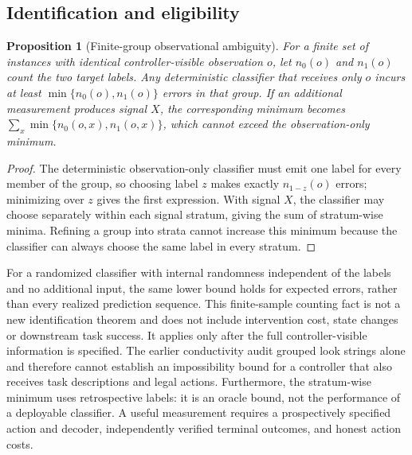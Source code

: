 \documentclass[11pt]{article}
\newtheorem{proposition}{Proposition}
\begin{document}
\subsection{Identification and eligibility}
\begin{proposition}[Finite-group observational ambiguity]
For a finite set of instances with identical controller-visible observation $o$, let $n_0(o)$ and $n_1(o)$ count the two target labels. Any deterministic classifier that receives only $o$ incurs at least $\min\{n_0(o),n_1(o)\}$ errors in that group. If an additional measurement produces signal $X$, the corresponding minimum becomes $\sum_x\min\{n_0(o,x),n_1(o,x)\}$, which cannot exceed the observation-only minimum.
\end{proposition}
\begin{proof}
The deterministic observation-only classifier must emit one label for every member of the group, so choosing label $z$ makes exactly $n_{1-z}(o)$ errors; minimizing over $z$ gives the first expression. With signal $X$, the classifier may choose separately within each signal stratum, giving the sum of stratum-wise minima. Refining a group into strata cannot increase this minimum because the classifier can always choose the same label in every stratum.
\end{proof}
For a randomized classifier with internal randomness independent of the labels and no additional input, the same lower bound holds for expected errors, rather than every realized prediction sequence. This finite-sample counting fact is not a new identification theorem and does not include intervention cost, state changes or downstream task success. It applies only after the full controller-visible information is specified. The earlier conductivity audit grouped look strings alone and therefore cannot establish an impossibility bound for a controller that also receives task descriptions and legal actions. Furthermore, the stratum-wise minimum uses retrospective labels: it is an oracle bound, not the performance of a deployable classifier. A useful measurement requires a prospectively specified action and decoder, independently verified terminal outcomes, and honest action costs.
\end{document}
